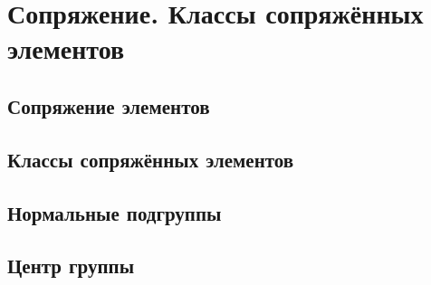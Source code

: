 \section{Сопряжение. Классы сопряжённых элементов}
\subsection{Сопряжение элементов}
\subsection{Классы сопряжённых элементов}
\subsection{Нормальные подгруппы}
\subsection{Центр группы}
